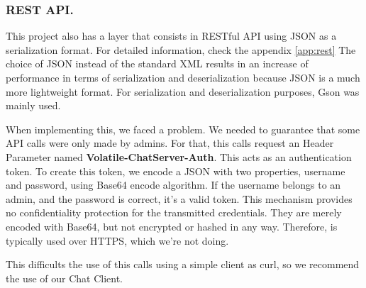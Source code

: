 \subsubsection{REST API.}
This project also has a layer that consists in RESTful API using JSON as a serialization format. For detailed information, check the appendix \ref{app:rest}
The choice of JSON instead of the standard XML results in an increase of performance in terms of serialization and deserialization because JSON is a much more lightweight format. For serialization and deserialization purposes, Gson was mainly used.

When implementing this, we faced a problem. We needed to guarantee that some API calls were only made by admins. For that, this calls request an Header Parameter named \textbf{Volatile-ChatServer-Auth}. This acts as an authentication token. To create this token, we encode a JSON with two properties, username and password, using Base64 encode algorithm. If the username belongs to an admin, and the password is correct, it's a valid token. This mechanism provides no confidentiality protection for the transmitted credentials. They are merely encoded with Base64, but not encrypted or hashed in any way. Therefore, is typically used over HTTPS, which we're not doing.


This difficults the use of this calls using a simple client as curl, so we recommend the use of our Chat Client.




